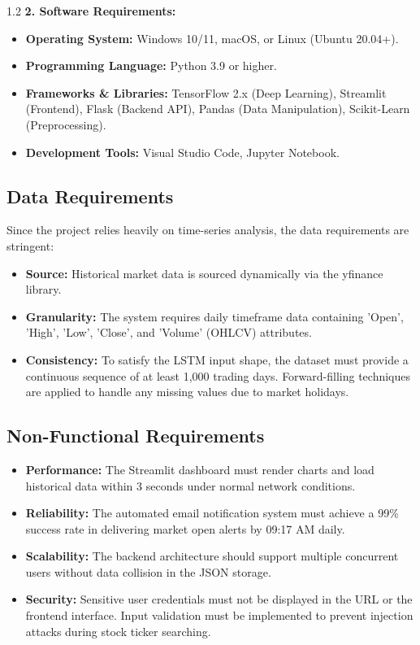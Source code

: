 \documentclass[12pt, a4paper]{report}
\begin{document}
\begin{spacing}{1.2}
\textbf{2. Software Requirements:} \begin{itemize} \item \textbf{Operating System:} Windows 10/11, macOS, or Linux (Ubuntu 20.04+). \item \textbf{Programming Language:} Python 3.9 or higher. \item \textbf{Frameworks \& Libraries:} TensorFlow 2.x (Deep Learning), Streamlit (Frontend), Flask (Backend API), Pandas (Data Manipulation), Scikit-Learn (Preprocessing). \item \textbf{Development Tools:} Visual Studio Code, Jupyter Notebook. \end{itemize}

\subsection{Data Requirements} Since the project relies heavily on time-series analysis, the data requirements are stringent: \begin{itemize} \item \textbf{Source:} Historical market data is sourced dynamically via the yfinance library. \item \textbf{Granularity:} The system requires daily timeframe data containing 'Open', 'High', 'Low', 'Close', and 'Volume' (OHLCV) attributes. \item \textbf{Consistency:} To satisfy the LSTM input shape, the dataset must provide a continuous sequence of at least 1,000 trading days. Forward-filling techniques are applied to handle any missing values due to market holidays. \end{itemize}

\subsection{Non-Functional Requirements}\begin{itemize} \item \textbf{Performance:} The Streamlit dashboard must render charts and load historical data within 3 seconds under normal network conditions. \item \textbf{Reliability:} The automated email notification system must achieve a 99\% success rate in delivering market open alerts by 09:17 AM daily. \item \textbf{Scalability:} The backend architecture should support multiple concurrent users without data collision in the JSON storage. \item \textbf{Security:} Sensitive user credentials must not be displayed in the URL or the frontend interface. Input validation must be implemented to prevent injection attacks during stock ticker searching. \end{itemize}


\end{spacing}
\end{document}
